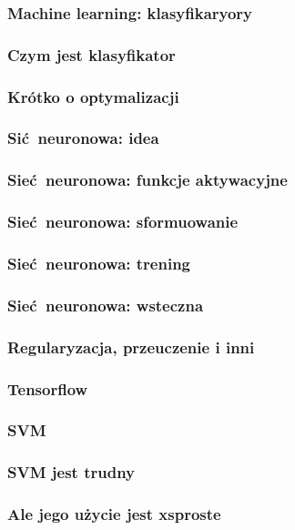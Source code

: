 \documentclass{beamer}
\begin{document}
\begin{frame}
\frametitle{Machine learning: klasyfikaryory}
\end{frame}

\begin{frame}
  \frametitle{Czym jest klasyfikator}
\end{frame}

\begin{frame}
  \frametitle{Krótko o optymalizacji}
\end{frame}

\begin{frame}
  \frametitle{Sić neuronowa: idea}
\end{frame}


\begin{frame}
  \frametitle{Sieć neuronowa: funkcje aktywacyjne}
\end{frame}


\begin{frame}
  \frametitle{Sieć neuronowa: sformuowanie}
\end{frame}

\begin{frame}
  \frametitle{Sieć neuronowa: trening}
\end{frame}


\begin{frame}
  \frametitle{Sieć neuronowa: wsteczna}
\end{frame}


\begin{frame}
  \frametitle{Regularyzacja, przeuczenie i inni}
\end{frame}


\begin{frame}
  \frametitle{Tensorflow}
\end{frame}


\begin{frame}
  \frametitle{SVM}
\end{frame}


\begin{frame}
  \frametitle{SVM jest trudny}
\end{frame}


\begin{frame}
  \frametitle{Ale jego użycie jest xsproste}
\end{frame}
\end{document}
